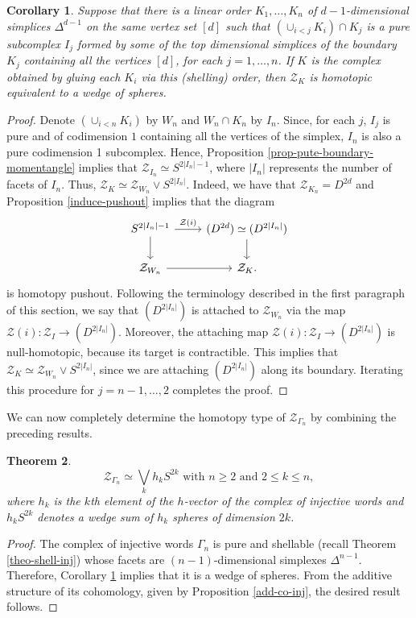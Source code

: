 \documentclass[a4paper,11pt]{article}
\newtheorem{theorem}{Theorem}[section]
\newtheorem{corollary}[theorem]{Corollary}
\theoremstyle{definition}
\newcommand{\ZZ}{\mathcal{Z}}
\begin{document}
\begin{corollary}\label{coro-wedge}
	Suppose that there is a linear order $K_1, \ldots, K_n$ of $d-1$-dimensional simplices $\Delta^{d-1}$ on the same vertex set $[d]$ such that $(\cup_{i < j} K_i) \cap K_j$ is a pure subcomplex $I_j$ formed by some of the top dimensional simplices of the boundary $K_j$ containing all the vertices $[d]$, for each $j = 1, \ldots, n$. If $K$ is the complex obtained by gluing each $K_i$ via this (shelling) order, then $\ZZ_K$ is homotopic equivalent to a wedge of spheres. 
\end{corollary}
\begin{proof}
	Denote $(\cup_{i < n} K_i)$ by $W_n$ and $W_n \cap K_n$ by $I_n$. Since, for each $j$, $I_j$ is pure and of codimension $1$ containing all the vertices of the simplex, $I_n$ is also a pure codimension 1 subcomplex. Hence, Proposition \ref{prop-pute-boundary-momentangle} implies that $\ZZ_{I_n} \simeq S^{2|I_n|-1}$, where $|I_n|$ represents the number of facets of $I_n$. Thus, $\ZZ_K \simeq \ZZ_{W_n} \vee S^{2|I_n|}$. Indeed, we have that $\ZZ_{K_n} = D^{2d}$ and Proposition \ref{induce-pushout} implies that the diagram
	\[
	\begin{tikzcd}
		S^{2|I_n| -1}\arrow[r, "\ZZ(i)"] \arrow[d] &  (D^{2d}) \simeq (D^{2|I_n|}) \arrow[d] \\
		\ZZ_{W_n} \arrow[r]  & \ZZ_{K}.
	\end{tikzcd}
	\]
	is homotopy pushout. Following the terminology described in the first paragraph of this section, we say that $(D^{2|I_n|})$ is attached to $\ZZ_{W_n}$ via the map $\ZZ(i): \ZZ_{I} \to (D^{2|I_n|})$. Moreover, the attaching map $\ZZ(i): \ZZ_{I} \to (D^{2|I_n|})$ is null-homotopic, because its target is contractible. This implies that $\ZZ_{K} \simeq \ZZ_{W_n} \vee S^{2|I_n|}$, since we are attaching $(D^{2|I_n|})$ along its boundary. Iterating this procedure for $j = n-1, \ldots, 2$ completes the proof.
\end{proof}

We can now completely determine the homotopy type of $\ZZ_{\Gamma_n}$ by combining the preceding results.
\begin{theorem}\label{homo-type-inj-moment-angle}
\[
\ZZ_{\Gamma_n} \simeq \bigvee_k h_k S^{2k} \text{ with } n\geq 2 \text{ and }  2 \leq k \leq n,
\]
where $h_k$ is the $k$th element of the $h$-vector of the complex of injective words and $h_k S^{2k}$ denotes a wedge sum of $h_k$ spheres of dimension $2k$.
\end{theorem}
\begin{proof}
The complex of injective words $\Gamma_n$ is pure and shellable (recall Theorem \ref{theo-shell-inj}) whose facets are $(n-1)$-dimensional simplexes $\Delta^{n-1}$. Therefore, Corollary \ref{coro-wedge} implies that it is a wedge of spheres. From the additive structure of its cohomology, given by Proposition \ref{add-co-inj}, the desired result follows. 
\end{proof}
\end{document}
